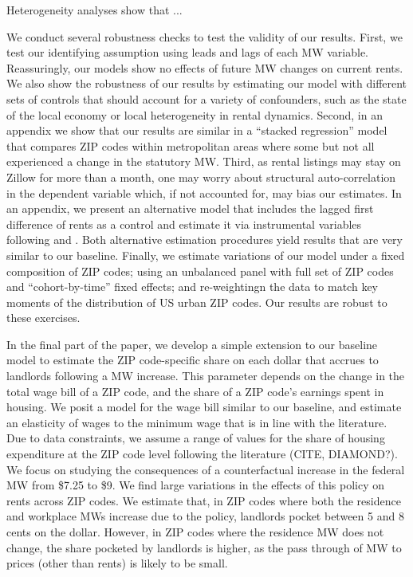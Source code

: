 Heterogeneity analyses show that ...


We conduct several robustness checks to test the validity of our results.
First, we test our identifying assumption using leads and lags of each MW variable.
Reassuringly, our models show no effects of future MW changes on current rents.
We also show the robustness of our results by estimating our model with different 
sets of controls that should account for a variety of confounders, such as the state
of the local economy or local heterogeneity in rental dynamics.
Second, in an appendix we show that our results are similar in a ``stacked regression'' 
model that compares ZIP codes within metropolitan areas where some but not all
experienced a change in the statutory MW.
Third, as rental listings may stay on Zillow for more than a month, one may worry 
about structural auto-correlation in the dependent variable which, if not accounted 
for, may bias our estimates.
In an appendix, we present an alternative model that includes the lagged first 
difference of rents as a control and estimate it via instrumental variables
following \textcite{ArellanoBond1991} and \textcite{MeerWest2016}.
Both alternative estimation procedures yield results that are very similar to our 
baseline.
Finally, we estimate variations of our model under a fixed composition of ZIP codes;
using an unbalanced panel with full set of ZIP codes and ``cohort-by-time'' fixed 
effects; and re-weightingn the data to match key moments of the distribution of 
US urban ZIP codes.
Our results are robust to these exercises.


In the final part of the paper, we develop a simple extension to our baseline model
to estimate the ZIP code-specific share on each dollar that accrues to landlords
following a MW increase.
This parameter depends on the change in the total wage bill of a ZIP code, and the 
share of a ZIP code's earnings spent in housing.
We posit a model for the wage bill similar to our baseline, and estimate an elasticity
of wages to the minimum wage that is in line with the literature. %
Due to data constraints, we assume a range of values for the share of housing
expenditure at the ZIP code level following the literature (CITE, DIAMOND?).
We focus on studying the consequences of a counterfactual increase 
in the federal MW from \$7.25 to \$9.
We find large variations in the effects of this policy on rents across ZIP codes.
We estimate that, in ZIP codes where both the residence and workplace MWs increase
due to the policy, landlords pocket between 5 and 8 cents on the dollar.
However, in ZIP codes where the residence MW does not change, the share pocketed
by landlords is higher, as the pass through of MW to prices (other than rents)
is likely to be small.


